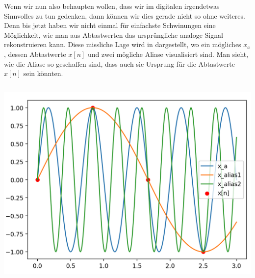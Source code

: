 Wenn wir nun also behaupten wollen, dass wir im digitalen irgendetwas Sinnvolles zu tun gedenken, dann können wir dies gerade nicht so ohne weiteres.
Denn bis jetzt haben wir nicht einmal für einfachste Schwinungen eine Möglichkeit, wie man aus Abtastwerten das ursprüngliche analoge Signal rekonstruieren kann.
Diese missliche Lage wird in  dargestellt, wo ein mögliches
$x_a$, dessen Abtastwerte $x[n]$ und zwei mögliche Aliase visualisiert sind.
Man sieht, wie die Aliase so geschaffen sind, dass auch sie Ursprung für die Abtastwerte $x[n]$ sein könnten.
%
\begin{listing}
    \noindent
    \begin{minipage}{0.49\textwidth}
        \strut\vspace*{-\baselineskip}\newline
        \inputminted[firstline=4]{python3}{code/aliasing.py}
    \end{minipage}%
    \begin{minipage}{0.49\textwidth}
        \strut\vspace*{-\baselineskip}\newline
        \includegraphics[width=\textwidth]{code/aliasing.png}
    \end{minipage}
    \label{py:aliasing}
\end{listing}


